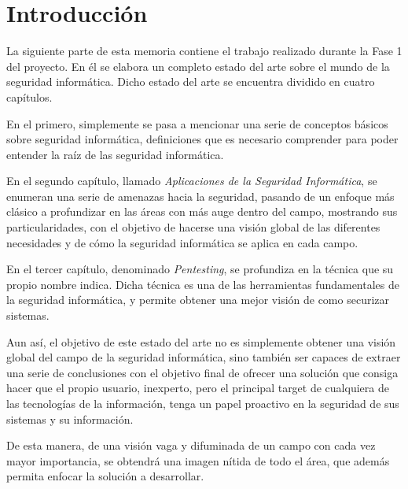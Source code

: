 \chapter{Introducción}

La siguiente parte de esta memoria contiene el trabajo realizado durante la Fase 1 del proyecto. En él se elabora un completo estado del arte sobre el mundo de la seguridad informática. Dicho estado del arte se encuentra dividido en cuatro capítulos.

En el primero, simplemente se pasa a mencionar una serie de conceptos básicos sobre seguridad informática, definiciones que es necesario comprender para poder entender la raíz de las seguridad informática.

En el segundo capítulo, llamado \textit{Aplicaciones de la Seguridad Informática}, se enumeran una serie de amenazas hacia la seguridad, pasando de un enfoque más clásico a profundizar en las áreas con más auge dentro del campo, mostrando sus particularidades, con el objetivo de hacerse una visión global de las diferentes necesidades y de cómo la seguridad informática se aplica en cada campo.

En el tercer capítulo, denominado \textit{Pentesting}, se profundiza en la técnica que su propio nombre indica. Dicha técnica es una de las herramientas fundamentales de la seguridad informática, y permite obtener una mejor visión de como securizar sistemas.

Aun así, el objetivo de este estado del arte no es simplemente obtener una visión global del campo de la seguridad informática, sino también ser capaces de extraer una serie de conclusiones con el objetivo final de ofrecer una solución que consiga hacer que el propio usuario, inexperto, pero el principal target de cualquiera de las tecnologías de la información, tenga un papel proactivo en la seguridad de sus sistemas y su información.

De esta manera, de una visión vaga y difuminada de un campo con cada vez mayor importancia, se obtendrá una imagen nítida de todo el área, que además permita enfocar la solución a desarrollar.